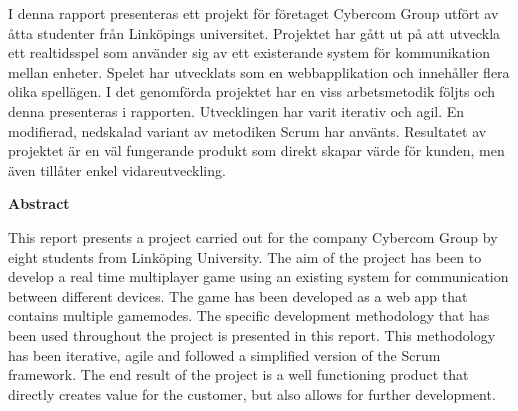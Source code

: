 {\justify
I denna rapport presenteras ett projekt för företaget Cybercom Group utfört av åtta studenter från Linköpings universitet. Projektet har gått ut på att utveckla ett realtidsspel som använder sig av ett existerande system för kommunikation mellan enheter. Spelet har utvecklats som en webbapplikation och innehåller flera olika spellägen. I det genomförda projektet har en viss arbetsmetodik följts och denna presenteras i rapporten. Utvecklingen har varit iterativ och agil. En modifierad, nedskalad variant av metodiken Scrum har använts. Resultatet av projektet är en väl fungerande produkt som direkt skapar värde för kunden, men även tillåter enkel vidareutveckling.\\[1in]\par
}
{\centering
  \indent\textbf{Abstract}\par
}
This report presents a project carried out for the company Cybercom Group by eight students from Linköping University. The aim of the project has been to develop a real time multiplayer game using an existing system for communication between different devices. The game has been developed as a web app that contains multiple gamemodes. The specific development methodology that has been used throughout the project is presented in this report. This methodology has been iterative, agile and followed a simplified version of the Scrum framework. The end result of the project is a well functioning product that directly creates value for the customer, but also allows for further development.
